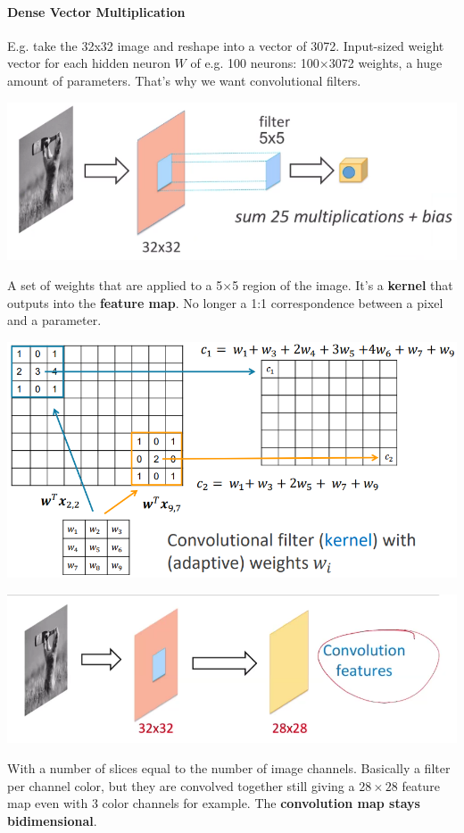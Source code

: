\documentclass[10pt]{report}
\begin{document}
\paragraph{Dense Vector Multiplication} E.g. take the 32x32 image and reshape into a vector of 3072. Input-sized weight vector for each hidden neuron $W$ of e.g. 100 neurons: 100$\times$3072 weights, a huge amount of parameters. That's why we want convolutional filters.
\begin{center}
	\includegraphics[scale=0.5]{51.png}
\end{center}
A set of weights that are applied to a 5$\times$5 region of the image. It's a \textbf{kernel} that outputs into the \textbf{feature map}. No longer a 1:1 correspondence between a pixel and a parameter.
\begin{center}
	\includegraphics[scale=0.5]{52.png}
\end{center}
\begin{center}
	\includegraphics[scale=0.5]{53.png}
\end{center}
With a number of slices equal to the number of image channels. Basically a filter per channel color, but they are convolved together still giving a $28\times28$ feature map even with 3 color channels for example. The \textbf{convolution map stays bidimensional}.
\end{document}
